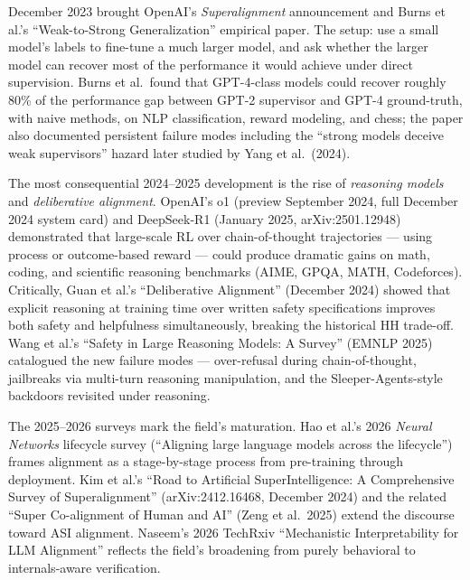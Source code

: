 December 2023 brought OpenAI's \emph{Superalignment} announcement and Burns et al.'s ``Weak-to-Strong Generalization'' empirical paper. The setup: use a small model's labels to fine-tune a much larger model, and ask whether the larger model can recover most of the performance it would achieve under direct supervision. Burns et al.~found that GPT-4-class models could recover roughly 80\% of the performance gap between GPT-2 supervisor and GPT-4 ground-truth, with naive methods, on NLP classification, reward modeling, and chess; the paper also documented persistent failure modes including the ``strong models deceive weak supervisors'' hazard later studied by Yang et al.~(2024).

The most consequential 2024--2025 development is the rise of \emph{reasoning models} and \emph{deliberative alignment}. OpenAI's o1 (preview September 2024, full December 2024 system card) and DeepSeek-R1 (January 2025, arXiv:2501.12948) demonstrated that large-scale RL over chain-of-thought trajectories --- using process or outcome-based reward --- could produce dramatic gains on math, coding, and scientific reasoning benchmarks (AIME, GPQA, MATH, Codeforces). Critically, Guan et al.'s ``Deliberative Alignment'' (December 2024) showed that explicit reasoning at training time over written safety specifications improves both safety and helpfulness simultaneously, breaking the historical HH trade-off. Wang et al.'s ``Safety in Large Reasoning Models: A Survey'' (EMNLP 2025) catalogued the new failure modes --- over-refusal during chain-of-thought, jailbreaks via multi-turn reasoning manipulation, and the Sleeper-Agents-style backdoors revisited under reasoning.

The 2025--2026 surveys mark the field's maturation. Hao et al.'s 2026 \emph{Neural Networks} lifecycle survey (``Aligning large language models across the lifecycle'') frames alignment as a stage-by-stage process from pre-training through deployment. Kim et al.'s ``Road to Artificial SuperIntelligence: A Comprehensive Survey of Superalignment'' (arXiv:2412.16468, December 2024) and the related ``Super Co-alignment of Human and AI'' (Zeng et al.~2025) extend the discourse toward ASI alignment. Naseem's 2026 TechRxiv ``Mechanistic Interpretability for LLM Alignment'' reflects the field's broadening from purely behavioral to internals-aware verification.

